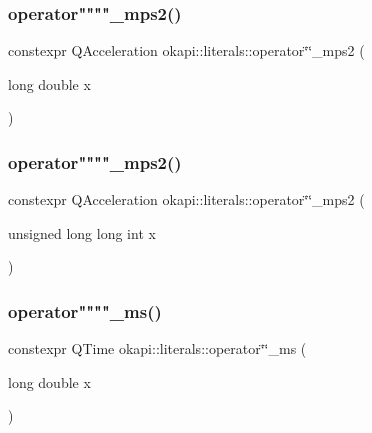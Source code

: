 \mbox{\label{namespaceokapi_1_1literals_a7aa45f65867b1b8c864d0c600a7a4cbc}} 
\subsubsection{\texorpdfstring{operator""""\_mps2()}{operator""\_mps2()}\hspace{0.1cm}{\footnotesize\ttfamily [1/2]}}
{\footnotesize\ttfamily constexpr Q\+Acceleration okapi\+::literals\+::operator\char`\"{}\char`\"{}\+\_\+mps2 (\begin{DoxyParamCaption}\item[{long double}]{x }\end{DoxyParamCaption})}

\mbox{\label{namespaceokapi_1_1literals_a7eada23b332074941b1264ffe7b65035}} 
\subsubsection{\texorpdfstring{operator""""\_mps2()}{operator""\_mps2()}\hspace{0.1cm}{\footnotesize\ttfamily [2/2]}}
{\footnotesize\ttfamily constexpr Q\+Acceleration okapi\+::literals\+::operator\char`\"{}\char`\"{}\+\_\+mps2 (\begin{DoxyParamCaption}\item[{unsigned long long int}]{x }\end{DoxyParamCaption})}

\mbox{\label{namespaceokapi_1_1literals_adca868a2cc4aefd3551db0c3cea478fe}} 
\subsubsection{\texorpdfstring{operator""""\_ms()}{operator""\_ms()}\hspace{0.1cm}{\footnotesize\ttfamily [1/2]}}
{\footnotesize\ttfamily constexpr Q\+Time okapi\+::literals\+::operator\char`\"{}\char`\"{}\+\_\+ms (\begin{DoxyParamCaption}\item[{long double}]{x }\end{DoxyParamCaption})}

